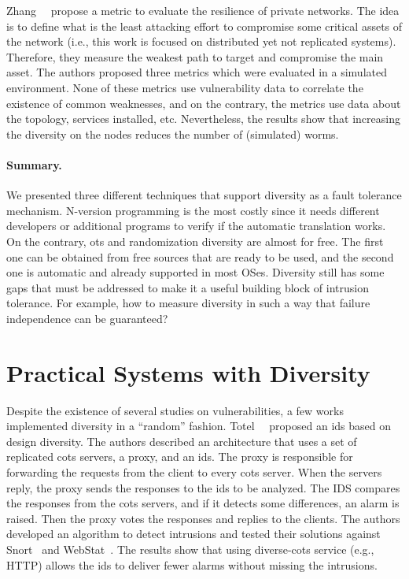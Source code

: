 Zhang~\etal{}~\cite{Zhang:2016} propose a metric to evaluate the resilience of private networks.
The idea is to define what is the least attacking effort to compromise some critical assets of the network (i.e., this work is focused on distributed yet not replicated systems).
Therefore, they measure the weakest path to target and compromise the main asset. 
The authors proposed three metrics which were evaluated in a simulated environment.
None of these metrics use vulnerability data to correlate the existence of common weaknesses, and on the contrary, the metrics use data about the topology, services installed, etc.
Nevertheless, the results show that increasing the diversity on the nodes reduces the number of (simulated) worms.
 

\paragraph{Summary.}
We presented three different techniques that support diversity as a fault tolerance mechanism. 
N-version programming is the most costly since it needs different developers or additional programs to verify if the automatic translation works. 
On the contrary, \gls{ots} and randomization diversity are almost for free. 
The first one can be obtained from free sources that are ready to be used, and the second one is automatic and already supported
in most OSes. 
Diversity still has some gaps that must be addressed to make it a useful building block of intrusion tolerance. 
For example, how to measure diversity in such a way that failure independence can be guaranteed?


\section{Practical Systems with Diversity}
Despite the existence of several studies on vulnerabilities, a few works implemented diversity in a ``random'' fashion.
Totel~\etal{}~\cite{Totel:2005} proposed an \gls{ids} based on design diversity.
The authors described an architecture that uses a set of replicated \gls{cots} servers, a proxy, and an \gls{ids}. 
The proxy is responsible for forwarding the requests from the client to every \gls{cots} server. 
When the servers reply, the proxy sends the responses to the \gls{ids} to be analyzed. 
The IDS compares the responses from the \gls{cots} servers, and if it detects some differences, an alarm is raised. 
Then the proxy votes the responses and replies to the clients. 
The authors developed an algorithm to detect intrusions and tested their solutions against Snort~\cite{snort} and WebStat~\cite{Vigna:2003}. 
The results show that using diverse-\gls{cots} service (e.g., HTTP) allows the \gls{ids} to deliver fewer alarms without missing the intrusions.

